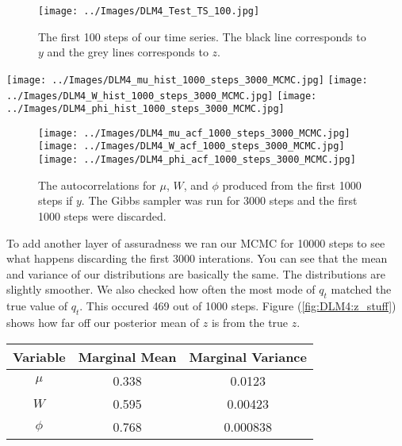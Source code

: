 \documentclass{article}
\begin{document}
\begin{figure}[!h]
\begin{center}
\texttt{[image: ../Images/DLM4\_Test\_TS\_100.jpg]}
\end{center}
\caption{The first 100 steps of our time series.  The black line corresponds to $y$ and the grey lines corresponds to $z$.}
\end{figure}

\begin{center}
\texttt{[image: ../Images/DLM4\_mu\_hist\_1000\_steps\_3000\_MCMC.jpg]}
\texttt{[image: ../Images/DLM4\_W\_hist\_1000\_steps\_3000\_MCMC.jpg]}
\texttt{[image: ../Images/DLM4\_phi\_hist\_1000\_steps\_3000\_MCMC.jpg]}
\end{center}

\begin{figure}[!h]
\begin{center}
\texttt{[image: ../Images/DLM4\_mu\_acf\_1000\_steps\_3000\_MCMC.jpg]}
\texttt{[image: ../Images/DLM4\_W\_acf\_1000\_steps\_3000\_MCMC.jpg]}
\texttt{[image: ../Images/DLM4\_phi\_acf\_1000\_steps\_3000\_MCMC.jpg]}
\end{center}
\caption{The autocorrelations for $\mu$, $W$, and $\phi$ produced from the first 1000 steps if $y$.  The Gibbs sampler was run for 3000 steps and the first 1000 steps were discarded.}
\end{figure}

To add another layer of assuradness we ran our MCMC for 10000 steps to see what happens discarding the first 3000 interations.  You can see that the mean and variance of our distributions are basically the same.  The distributions are slightly smoother.  We also checked how often the most mode of $q_t$ matched the true value of $q_t$.  This occured 469 out of 1000 steps.  Figure (\ref{fig:DLM4:z_stuff}) shows how far off our posterior mean of $z$ is from the true $z$.

\begin{center}
\begin{tabular}{c | c | c}
Variable & Marginal Mean & Marginal Variance \\
\hline
$\mu$ & 0.338 & 0.0123 \\
$W$ & 0.595 & 0.00423 \\
$\phi$ & 0.768 & 0.000838 \\
\end{tabular}
\end{center}
\end{document}
